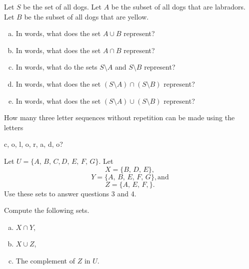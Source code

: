 \documentclass[12pt]{amsart}
\begin{document}
\begin{thm}[10 Points]\label{ex4}
  Let $S$ be the set of all dogs.
  Let $A$ be the subset of all dogs that are labradors.
  Let $B$ be the subset of all dogs that are yellow.
  \begin{enumerate}[(a)]
  \item
    In words, what does the set $A \cup B$ represent?
    \vspace{1.5in}
  \item
    In words, what does the set $A \cap B$ represent?
    \vspace{1.5in}
  \item
    In words, what do the sets $S \setminus A$ and $S \setminus B$ represent?
    \vspace{1.5in}
  \item
    In words, what does the set $\left(S \setminus A\right) \cap \left(S \setminus B\right)$ represent?
    \vspace{1.5in}
  \item
    In words, what does the set $\left(S \setminus A\right) \cup \left(S \setminus B\right)$ represent?
  \end{enumerate}
\end{thm}

\newpage

\begin{thm}[10 Points]\label{ex3}
  How many three letter sequences without repetition can be made using the letters
  \begin{center}c, o, l, o, r, a, d, o?\end{center}
\end{thm}

\newpage

\noindent Let $U = \{A,\, B,\, C, D,\, E,\, F,\, G\}$.
Let 
$$X = \{B,\, D,\, E\},$$
$$Y = \{A,\, B,\, E,\, F,\, G\}, \text{and}$$
$$Z = \{A,\, E,\,F,\}.$$
Use these sets to answer questions 3 and 4.
\begin{thm}[10 Points]\label{ex4}
  Compute the following sets.
  \begin{enumerate}[(a)]
  \item
    $X \cap Y$,
    \vspace{1in}
  \item
    $X \cup Z$,
    \vspace{1in}
  \item
    The complement of $Z$ in $U$.
    \vspace{1in}
  \end{enumerate}
\end{thm}
\end{document}
